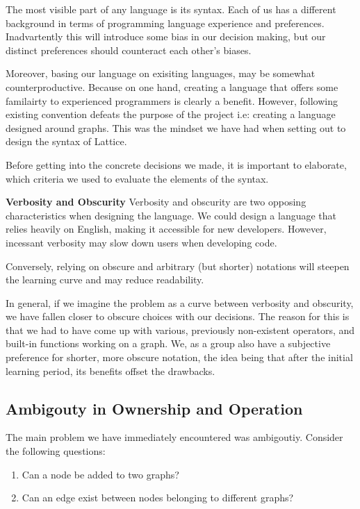 The most visible part of any language is its syntax. Each of us has a different background in terms of programming language
experience and preferences. Inadvartently this will introduce some bias in our decision making, but our distinct preferences
should counteract each other's biases.

Moreover, basing our language on exisiting languages, may be somewhat counterproductive. Because on one hand, creating a
language that offers some familairty to experienced programmers is clearly a benefit. However, following existing convention
defeats the purpose of the project i.e: creating a language designed around graphs. This was the mindset we have had
when setting out to design the syntax of Lattice.

Before getting into the concrete decisions we made, it is important to elaborate, which criteria we used to evaluate
the elements of the syntax.

\textbf{Verbosity and Obscurity}
Verbosity and obscurity are two opposing characteristics when designing the language.
We could design a language that
relies heavily on English, making it accessible for new developers.
However, incessant verbosity may slow down users when developing code.

Conversely, relying on obscure and arbitrary (but shorter) notations will
steepen the learning curve and may reduce readability.

In general, if we imagine the problem as a curve between verbosity and obscurity, we have fallen closer to
obscure choices with our decisions.
The reason for this is that we had to have come up with various, previously
non-existent operators, and built-in functions working on a graph.
We, as a group also have a subjective preference for shorter, more obscure notation, the idea being that
after the initial learning period, its benefits offset the drawbacks.

\subsection{Ambigouty in Ownership and Operation}
The main problem we have immediately encountered was ambigoutiy. Consider the following questions:

\begin{enumerate}
    \item Can a node be added to two graphs?
    \item Can an edge exist between nodes belonging to different graphs?
\end{enumerate}

